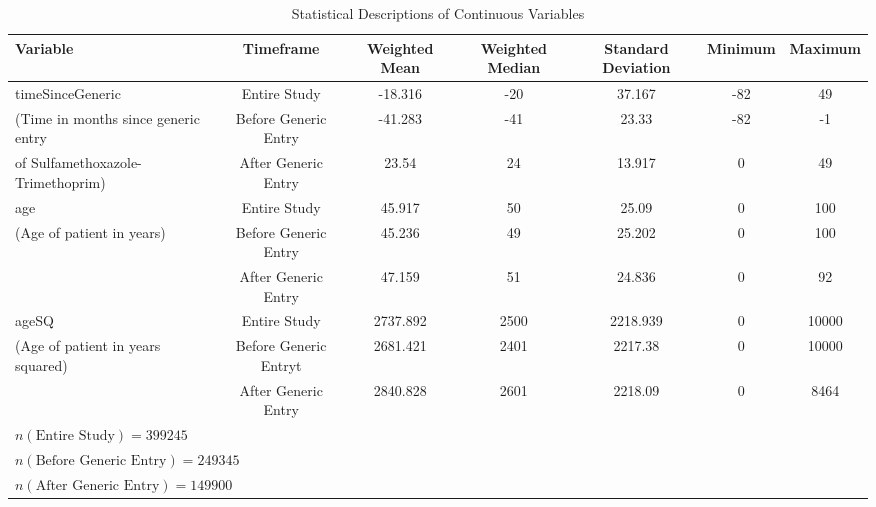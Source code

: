 \begin{table}[htbp]\centering
\def\sym#1{\ifmmode^{#1}\else\(^{#1}\)\fi}
\caption{Statistical Descriptions of Continuous Variables\label{tab1}}
\begin{tabular}{l*{6}{c}}
\hline\hline
            Variable&\multicolumn{1}{c}{Timeframe}&\multicolumn{1}{c}{Weighted Mean}&\multicolumn{1}{c}{Weighted Median}&\multicolumn{1}{c}{Standard Deviation}&\multicolumn{1}{c}{Minimum}&\multicolumn{1}{c}{Maximum}\\
\hline
timeSinceGeneric                    &     Entire Study&             -18.316&    -20&   37.167&     -82&  49\\
(Time in months since generic entry &     Before Generic Entry&     -41.283&    -41&    23.33 &     -82&  -1\\
of Sulfamethoxazole-Trimethoprim)   &     After Generic Entry&       23.54 &    24&      13.917&     0&  49\\
[1em]
age                                 &     Entire Study&             45.917&    50&    25.09 &     0&  100\\
(Age of patient in years)           &     Before Generic Entry&     45.236&    49&    25.202&     0&  100\\
                                    &     After Generic Entry&      47.159&    51&    24.836&     0&  92\\
[1em]
ageSQ                               &     Entire Study&             2737.892&    2500&  2218.939&     0&  10000\\
(Age of patient in years squared)   &     Before Generic Entryt&    2681.421&    2401&  2217.38 &     0&  10000\\
                                    &     After Generic Entry&      2840.828&    2601&  2218.09 &     0&  8464\\
\hline
$n(\text{Entire Study}) = 399245$\\
$n(\text{Before Generic Entry}) = 249345$\\
$n(\text{After Generic Entry}) = 149900$\\
\hline\hline

\end{tabular}
\label{tab:Table4.2}
\end{table}
